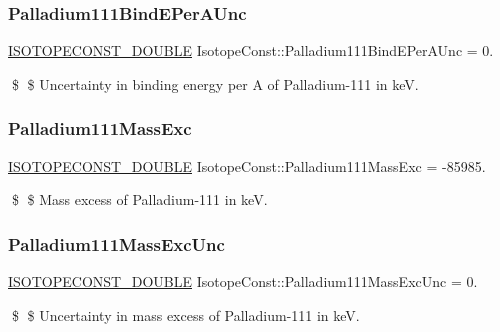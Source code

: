 \subsubsection{\texorpdfstring{Palladium111\+Bind\+E\+Per\+A\+Unc}{Palladium111BindEPerAUnc}}
{\footnotesize\ttfamily \mbox{\hyperlink{group___isotope_const-_macros_ga8f45a7272ce02c0b4c65c44636ed719a}{I\+S\+O\+T\+O\+P\+E\+C\+O\+N\+S\+T\+\_\+\+D\+O\+U\+B\+LE}} Isotope\+Const\+::\+Palladium111\+Bind\+E\+Per\+A\+Unc = 0.}

\$ \$ Uncertainty in binding energy per A of Palladium-\/111 in keV. \mbox{\label{group___isotope_const-_palladium-_pd111_ga09487abda8aacfae61f9cf79bc67228f}} 
\subsubsection{\texorpdfstring{Palladium111\+Mass\+Exc}{Palladium111MassExc}}
{\footnotesize\ttfamily \mbox{\hyperlink{group___isotope_const-_macros_ga8f45a7272ce02c0b4c65c44636ed719a}{I\+S\+O\+T\+O\+P\+E\+C\+O\+N\+S\+T\+\_\+\+D\+O\+U\+B\+LE}} Isotope\+Const\+::\+Palladium111\+Mass\+Exc = -\/85985.}

\$ \$ Mass excess of Palladium-\/111 in keV. \mbox{\label{group___isotope_const-_palladium-_pd111_gadc34ae1ae70b9141b49c4268f3358d2d}} 
\subsubsection{\texorpdfstring{Palladium111\+Mass\+Exc\+Unc}{Palladium111MassExcUnc}}
{\footnotesize\ttfamily \mbox{\hyperlink{group___isotope_const-_macros_ga8f45a7272ce02c0b4c65c44636ed719a}{I\+S\+O\+T\+O\+P\+E\+C\+O\+N\+S\+T\+\_\+\+D\+O\+U\+B\+LE}} Isotope\+Const\+::\+Palladium111\+Mass\+Exc\+Unc = 0.}

\$ \$ Uncertainty in mass excess of Palladium-\/111 in keV. \mbox{\label{group___isotope_const-_palladium-_pd111_ga67d9eddb284d9c8eb1afb4ae3788d1b5}} 
